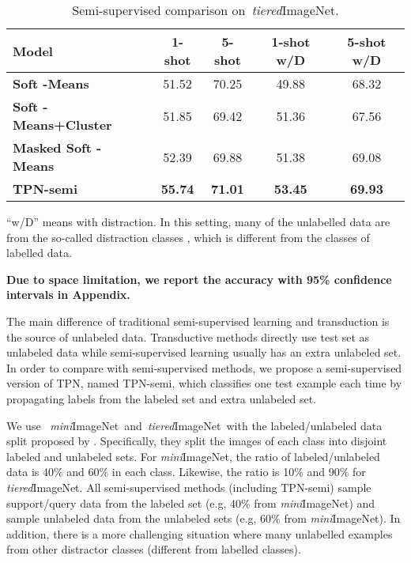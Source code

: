 \documentclass{article} \usepackage{iclr2019_conference,times}
\def\mini{{\textit{mini}ImageNet}}
\def\tiered{{\textit{tiered}ImageNet}}
\begin{document}
\begin{table}[ht]
\centering
\begin{threeparttable}
\small
\caption{Semi-supervised comparison on~\tiered.}
\label{semi-tiered}
\begin{tabular}{lcccc}
\hline
Model                            						 & \multicolumn{1}{c}{1-shot} & \multicolumn{1}{c}{5-shot} & \multicolumn{1}{c}{1-shot w/D} & \multicolumn{1}{c}{5-shot w/D} \\ \hline
\textbf{Soft -Means~\citep{semi-proto}}          & 51.52 & 70.25 & 49.88 & 68.32\\
\textbf{Soft -Means+Cluster~\citep{semi-proto}}  & 51.85 & 69.42 & 51.36 & 67.56\\
\textbf{Masked Soft -Means~\citep{semi-proto}}   & 52.39 & 69.88 & 51.38 & 69.08\\ \hline
\textbf{TPN-semi}                                   & \textbf{55.74} & \textbf{71.01} & \textbf{53.45} & \textbf{69.93}\\ \hline
\end{tabular}
\begin{tablenotes}
  	\item * ``w/D'' means with distraction. In this setting, many of the unlabelled data are from the so-called distraction classes , which is different from the classes of labelled data.
  	\item  \textbf{Due to space limitation, we report the accuracy with 95\% confidence intervals in Appendix.}
\end{tablenotes} 
\end{threeparttable}
\end{table}

The main difference of traditional semi-supervised learning and transduction is the source of unlabeled data. Transductive methods directly use test set as unlabeled data while semi-supervised learning usually has an extra unlabeled set. In order to compare with semi-supervised methods, we propose a semi-supervised version of TPN, named TPN-semi, which classifies one test example each time by propagating labels from the labeled set and extra unlabeled set. 

We use ~\mini~and~\tiered~with the labeled/unlabeled data split proposed by \cite{semi-proto}. Specifically, they split the images of each class into disjoint labeled and unlabeled sets. For \mini, the ratio of labeled/unlabeled data is 40\% and 60\% in each class. Likewise,  the ratio is 10\% and 90\% for \tiered. All semi-supervised methods (including TPN-semi) sample support/query data from the labeled set (e.g, 40\% from \mini) and sample unlabeled data from the unlabeled sets (e.g, 60\% from \mini). In addition, there is a more challenging situation where many unlabelled examples from other distractor classes (different from labelled classes). 
\end{document}
